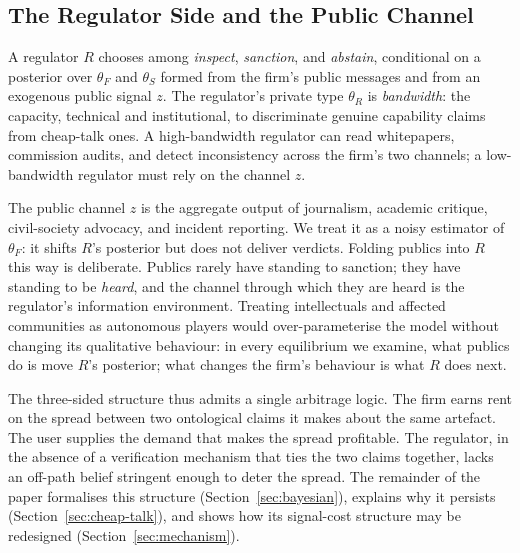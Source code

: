 \subsection{The Regulator Side and the Public Channel}
\label{subsec:regulator-side}

A regulator $R$ chooses among \emph{inspect}, \emph{sanction}, and \emph{abstain}, conditional on a posterior over $\theta_F$ and $\theta_S$ formed from the firm's public messages and from an exogenous public signal $z$. The regulator's private type $\theta_R$ is \emph{bandwidth}: the capacity, technical and institutional, to discriminate genuine capability claims from cheap-talk ones. A high-bandwidth regulator can read whitepapers, commission audits, and detect inconsistency across the firm's two channels; a low-bandwidth regulator must rely on the channel $z$.

The public channel $z$ is the aggregate output of journalism, academic critique, civil-society advocacy, and incident reporting. We treat it as a noisy estimator of $\theta_F$: it shifts $R$'s posterior but does not deliver verdicts. Folding publics into $R$ this way is deliberate. Publics rarely have standing to sanction; they have standing to be \emph{heard}, and the channel through which they are heard is the regulator's information environment. Treating intellectuals and affected communities as autonomous players would over-parameterise the model without changing its qualitative behaviour: in every equilibrium we examine, what publics do is move $R$'s posterior; what changes the firm's behaviour is what $R$ does next.

The three-sided structure thus admits a single arbitrage logic. The firm earns rent on the spread between two ontological claims it makes about the same artefact. The user supplies the demand that makes the spread profitable. The regulator, in the absence of a verification mechanism that ties the two claims together, lacks an off-path belief stringent enough to deter the spread. The remainder of the paper formalises this structure (Section~\ref{sec:bayesian}), explains why it persists (Section~\ref{sec:cheap-talk}), and shows how its signal-cost structure may be redesigned (Section~\ref{sec:mechanism}).

